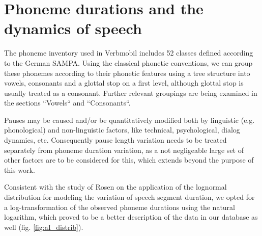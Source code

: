 \documentclass[a4paper]{scrreprt}
\begin{document}
\chapter{Phoneme durations and the dynamics of speech}
The phoneme inventory used in Verbmobil includes 52 classes defined according to the German SAMPA. Using the classical phonetic conventions, we can group these phonemes according to their phonetic features using a tree structure into vowels, consonants and a glottal stop on a first level, although glottal stop is usually treated as a consonant. Further relevant groupings are being examined in the sections ``Vowels`` and ``Consonants``.

Pauses may be caused and/or be quantitatively modified both by linguistic (e.g. phonological) and non-linguistic factors, like technical, psychological, dialog dynamics, etc. Consequently pause length variation needs to be treated separately from phoneme duration variation, as a not negligeable large set of other factors are to be considered for this, which extends beyond the purpose of this work.

Consistent with the study of Rosen \cite{Rosen2005} on the application of the lognormal distribution for modeling the variation of speech segment duration, we opted for a log-transformation of the observed phoneme durations using the natural logarithm, which proved to be a better description of the data in our database as well (fig. \ref{fig:aI_distrib}).
\end{document}
